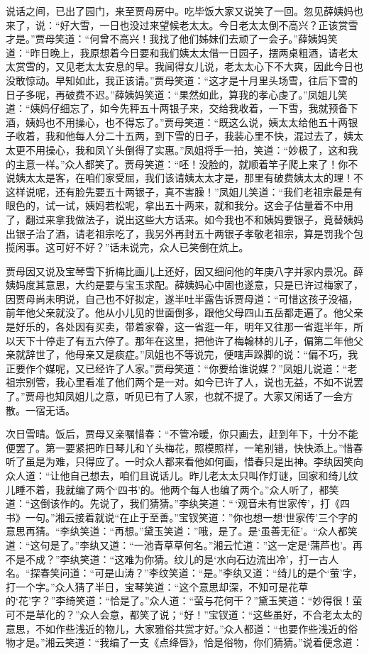 说话之间，已出了园门，来至贾母房中。吃毕饭大家又说笑了一回。忽见薛姨妈也来了，说：“好大雪，一日也没过来望候老太太。今日老太太倒不高兴？正该赏雪才是。”贾母笑道：“何曾不高兴！我找了他们姊妹们去顽了一会子。”薛姨妈笑道：“昨日晚上，我原想着今日要和我们姨太太借一日园子，摆两桌粗酒，请老太太赏雪的，又见老太太安息的早。我闻得女儿说，老太太心下不大爽，因此今日也没敢惊动。早知如此，我正该请。”贾母笑道：“这才是十月里头场雪，往后下雪的日子多呢，再破费不迟。”薛姨妈笑道：“果然如此，算我的孝心虔了。”凤姐儿笑道：“姨妈仔细忘了，如今先秤五十两银子来，交给我收着，一下雪，我就预备下酒，姨妈也不用操心，也不得忘了。”贾母笑道：“既这么说，姨太太给他五十两银子收着，我和他每人分二十五两，到下雪的日子，我装心里不快，混过去了，姨太太更不用操心，我和凤丫头倒得了实惠。”凤姐将手一拍，笑道：“妙极了，这和我的主意一样。”众人都笑了。贾母笑道：“呸！没脸的，就顺着竿子爬上来了！你不说姨太太是客，在咱们家受屈，我们该请姨太太才是，那里有破费姨太太的理！不这样说呢，还有脸先要五十两银子，真不害臊！”凤姐儿笑道：“我们老祖宗最是有眼色的，试一试，姨妈若松呢，拿出五十两来，就和我分。这会子估量着不中用了，翻过来拿我做法子，说出这些大方话来。如今我也不和姨妈要银子，竟替姨妈出银子治了酒，请老祖宗吃了，我另外再封五十两银子孝敬老祖宗，算是罚我个包揽闲事。这可好不好？”话未说完，众人已笑倒在炕上。

贾母因又说及宝琴雪下折梅比画儿上还好，因又细问他的年庚八字并家内景况。薛姨妈度其意思，大约是要与宝玉求配。薛姨妈心中固也遂意，只是已许过梅家了，因贾母尚未明说，自己也不好拟定，遂半吐半露告诉贾母道：“可惜这孩子没福，前年他父亲就没了。他从小儿见的世面倒多，跟他父母四山五岳都走遍了。他父亲是好乐的，各处因有买卖，带着家眷，这一省逛一年，明年又往那一省逛半年，所以天下十停走了有五六停了。那年在这里，把他许了梅翰林的儿子，偏第二年他父亲就辞世了，他母亲又是痰症。”凤姐也不等说完，便嗐声跺脚的说：“偏不巧，我正要作个媒呢，又已经许了人家。”贾母笑道：“你要给谁说媒？”凤姐儿说道：“老祖宗别管，我心里看准了他们两个是一对。如今已许了人，说也无益，不如不说罢了。”贾母也知凤姐儿之意，听见已有了人家，也就不提了。大家又闲话了一会方散。一宿无话。

次日雪晴。饭后，贾母又亲嘱惜春：“不管冷暖，你只画去，赶到年下，十分不能便罢了。第一要紧把昨日琴儿和丫头梅花，照模照样，一笔别错，快快添上。”惜春听了虽是为难，只得应了。一时众人都来看他如何画，惜春只是出神。李纨因笑向众人道：“让他自己想去，咱们且说话儿。昨儿老太太只叫作灯谜，回家和绮儿纹儿睡不着，我就编了两个‘四书’的。他两个每人也编了两个。”众人听了，都笑道：“这倒该作的。先说了，我们猜猜。”李纨笑道：“\,‘观音未有世家传’，打《四书》一句。”湘云接着就说“在止于至善。”宝钗笑道：”你也想一想‘世家传’三个字的意思再猜。“李纨笑道：“再想。”黛玉笑道：”哦，是了。是‘虽善无征’。“众人都笑道：“这句是了。”李纨又道：“一池青草草何名。”湘云忙道：”这一定是‘蒲芦也’。再不是不成？”李纨笑道：“这难为你猜。纹儿的是‘水向石边流出冷’，打一古人名。“探春笑问道：“可是山涛？”李纹笑道：“是。”李纨又道：“绮儿的是个‘萤’字，打一个字。”众人猜了半日，宝琴笑道：“这个意思却深，不知可是花草的‘花’字？”李绮笑道：“恰是了。”众人道：“萤与花何干？”黛玉笑道：“妙得很！萤可不是草化的？”众人会意，都笑了说；“好！”宝钗道：“这些虽好，不合老太太的意思，不如作些浅近的物儿，大家雅俗共赏才好。”众人都道：“也要作些浅近的俗物才是。”湘云笑道：“我编了一支《点绛唇》，恰是俗物，你们猜猜。”说着便念道：

